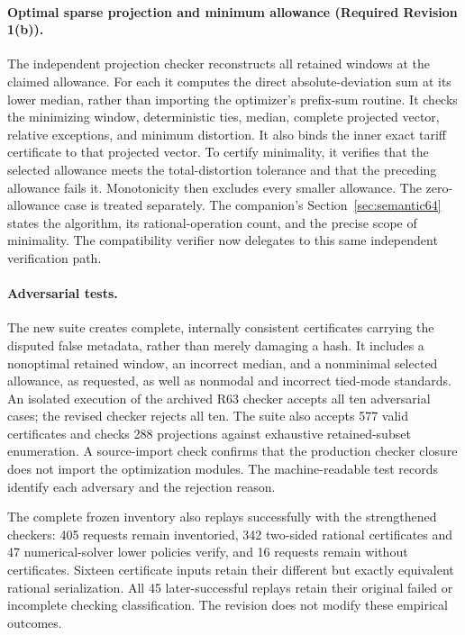 \documentclass[11pt,letterpaper]{article}
\theoremstyle{definition}\newtheorem{remark}[theorem]{Remark}
\begin{document}
\paragraph{Optimal sparse projection and minimum allowance (Required Revision 1(b)).}
The independent projection checker reconstructs all retained windows at the claimed allowance. For each it computes the direct absolute-deviation sum at its lower median, rather than importing the optimizer's prefix-sum routine. It checks the minimizing window, deterministic ties, median, complete projected vector, relative exceptions, and minimum distortion. It also binds the inner exact tariff certificate to that projected vector. To certify minimality, it verifies that the selected allowance meets the total-distortion tolerance and that the preceding allowance fails it. Monotonicity then excludes every smaller allowance. The zero-allowance case is treated separately. The companion's Section~\ref{sec:semantic64} states the algorithm, its rational-operation count, and the precise scope of minimality. The compatibility verifier now delegates to this same independent verification path.

\paragraph{Adversarial tests.}
The new suite creates complete, internally consistent certificates carrying the disputed false metadata, rather than merely damaging a hash. It includes a nonoptimal retained window, an incorrect median, and a nonminimal selected allowance, as requested, as well as nonmodal and incorrect tied-mode standards. An isolated execution of the archived R63 checker accepts all ten adversarial cases; the revised checker rejects all ten. The suite also accepts 577 valid certificates and checks 288 projections against exhaustive retained-subset enumeration. A source-import check confirms that the production checker closure does not import the optimization modules. The machine-readable test records identify each adversary and the rejection reason.

The complete frozen inventory also replays successfully with the strengthened checkers: 405 requests remain inventoried, 342 two-sided rational certificates and 47 numerical-solver lower policies verify, and 16 requests remain without certificates. Sixteen certificate inputs retain their different but exactly equivalent rational serialization. All 45 later-successful replays retain their original failed or incomplete checking classification. The revision does not modify these empirical outcomes.
\end{document}
